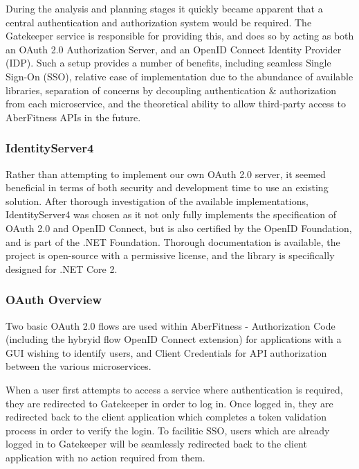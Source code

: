 During the analysis and planning stages it quickly became apparent that a central authentication and authorization system would be required.  The Gatekeeper service is responsible for providing this, and does so by acting as both an OAuth 2.0 Authorization Server, and an OpenID Connect Identity Provider (IDP).  Such a setup provides a number of benefits, including seamless Single Sign-On (SSO), relative ease of implementation due to the abundance of available libraries, separation of concerns by decoupling authentication \& authorization from each microservice, and the theoretical ability to allow third-party access to AberFitness APIs in the future.

\subsubsection{IdentityServer4}

Rather than attempting to implement our own OAuth 2.0 server, it seemed beneficial in terms of both security and development time to use an existing solution.  After thorough investigation of the available implementations, IdentityServer4\cite{identityserver4} was chosen as it not only fully implements the specification of OAuth 2.0 and OpenID Connect, but is also certified by the OpenID Foundation\cite{identityserver4docs}, and is part of the .NET Foundation.  Thorough documentation is available, the project is open-source with a permissive license, and the library is specifically designed for .NET Core 2.

\subsubsection{OAuth Overview}

Two basic OAuth 2.0 flows are used within AberFitness - Authorization Code (including the hybryid flow OpenID Connect extension) for applications with a GUI wishing to identify users, and Client Credentials for API authorization between the various microservices.

When a user first attempts to access a service where authentication is required, they are redirected to Gatekeeper in order to log in.  Once logged in, they are redirected back to the client application which completes a token validation process in order to verify the login.  To facilitie SSO, users which are already logged in to Gatekeeper will be seamlessly redirected back to the client application with no action required from them.

